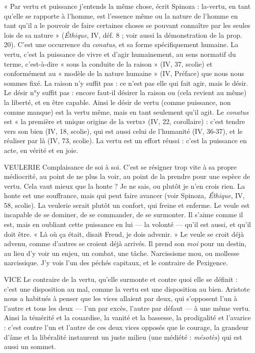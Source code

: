 « Par vertu et puissance j'entends la même chose, écrit Spinoza : la-vertu, en
tant qu’elle se rapporte à l’homme, est l’essence même ou la nature de l’homme
en tant qu’il a le pouvoir de faire certaines choses se pouvant connaître par les
seules lois de sa nature » ({\it Éthique}, IV, déf. 8 ; voir aussi la démonstration de la
prop. 20). C’est une occurrence du {\it conatus}, et sa forme spécifiquement
humaine. La vertu, c’est la puissance de vivre et d’agir humainement, au sens
normatif du terme, c’est-à-dire « sous la conduite de la raison » (IV, 37, scolie)
et conformément au « modèle de la nature humaine » (IV, Préface) que nous
nous sommes fixé. La raison n’y suffit pas : ce n’est pas elle qui fait agir, mais
le désir. Le désir n°y suffit pas : encore faut-il désirer la raison ou (cela revient
au même) la liberté, et en être capable. Ainsi le désir de vertu (comme puissance,
non comme manque) est la vertu même, mais en tant seulement qu’il
agit. Le {\it conatus} est « la première et unique origine de la vertu» (IV, 22,
corollaire) : c’est tendre vers son bien (IV, 18, scolie), qui est aussi celui de
l'humanité (IV, 36-37), et le réaliser par là (IV, 73, scolie). La vertu est un
effort réussi : c’est la puissance en acte, en vérité et en joie.

VEULERIE Complaisance de soi à soi. C’est se résigner trop vite à sa propre
médiocrité, au point de ne plus la voir, au point de la prendre
pour une espèce de vertu. Cela vaut mieux que la honte ? Je ne sais, ou plutôt
je n’en crois rien. La honte est une souffrance, mais qui peut faire avancer (voir
Spinoza, {\it Éthique}, IV, 58, scolie). La veulerie serait plutôt un confort, qui freine
et enferme. Le veule est incapable de se dominer, de se commander, de se surmonter.
Il s'aime comme il est, mais en oubliant cette puissance en lui — la
volonté — qu’il est aussi, et qu’il doit être. « Là où ça était, disait Freud, je dois
advenir. » Le veule se croit déjà advenu, comme d’autres se croient déjà arrivés.
Il prend son {\it moi} pour un destin, au lieu d’y voir un enjeu, un combat, une
tâche. Narcissisme mou, ou mollesse narcissique. J’y vois l’un des péchés capitaux,
et le contraire de Pexigence.

VICE Le contraire de la vertu, qu’elle surmonte et contre quoi elle se définit :
c’est une disposition au mal, comme la vertu est une disposition
au bien.
Aristote nous a habitués à penser que les vices allaient par deux, qui s’opposent
l'un à l’autre et tous les deux — l’un par excès, l’autre par défaut — à une
même vertu. Ainsi la témérité et la couardise, la vanité et la bassesse, la prodigalité
et l’avarice : c’est contre l’un et l’autre de ces deux vices opposés que le
courage, la grandeur d’âme et la libéralité instaurent un juste milieu (une
médiété : {\it mésotès}) qui est aussi un sommet.

